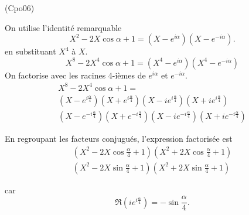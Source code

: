 \begin{tiny}(Cpo06)\end{tiny} On utilise l'identité remarquable
\[
 X^2-2X \cos \alpha + 1 
 = (X-e^{i\alpha})(X-e^{-i\alpha}).
\]
en substituant $X^4$ à $X$.
\[
 X^8 -2X^4\cos \alpha + 1
 = (X^4-e^{i\alpha})(X^4-e^{-i\alpha})
\]
On factorise avec les racines 4-ièmes de $e^{i\alpha}$ et $e^{-i\alpha}$.
\begin{multline*}
 X^8 -2X^4\cos \alpha + 1 = \\
 (X-e^{i\frac{\alpha}{4}})(X+e^{i\frac{\alpha}{4}})(X-ie^{i\frac{\alpha}{4}})(X+ie^{i\frac{\alpha}{4}})\\
 (X-e^{-i\frac{\alpha}{4}})(X+e^{-i\frac{\alpha}{4}})(X-ie^{-i\frac{\alpha}{4}})(X+ie^{-i\frac{\alpha}{4}})
\end{multline*}

En regroupant les facteurs conjugués, l'expression factorisée est
\begin{multline*}
 (X^2-2X\cos\frac{\alpha}{4}+1)(X^2 + 2X\cos\frac{\alpha}{4}+1)\\
 (X^2-2X\sin\frac{\alpha}{4}+1)(X^2 + 2X\sin\frac{\alpha}{4}+1)
\end{multline*}

car
\[
 \Re(ie^{i\frac{\alpha}{4}}) = -\sin\frac{\alpha}{4}.
\]

